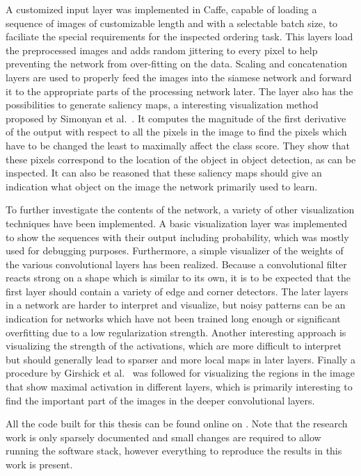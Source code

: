 A customized input layer was implemented in Caffe, capable of loading a sequence of images of customizable length and with a selectable batch size, to faciliate the special requirements for the inspected ordering task. This layers load the preprocessed images and adds random jittering to every pixel to help preventing the network from over-fitting on the data. Scaling and concatenation layers are used to properly feed the images into the siamese network and forward it to the appropriate parts of the processing network later. The layer also has the possibilities to generate saliency maps, a interesting visualization method proposed by Simonyan et al.~\cite{simonyan2013}. It computes the magnitude of the first derivative of the output with respect to all the pixels in the image to find the pixels which have to be changed the least to maximally affect the class score. They show that these pixels correspond to the location of the object in object detection, as can be inspected. It can also be reasoned that these saliency maps should give an indication what object on the image the network primarily used to learn.

To further investigate the contents of the network, a variety of other visualization techniques have been implemented. A basic visualization layer was implemented to show the sequences with their output including probability, which was mostly used for debugging purposes. Furthermore, a simple visualizer of the weights of the various convolutional layers has been realized. Because a convolutional filter reacts strong on a shape which is similar to its own, it is to be expected that the first layer should contain a variety of edge and corner detectors. The later layers in a network are harder to interpret and visualize, but noisy patterns can be an indication for networks which have not been trained long enough or significant overfitting due to a low regularization strength\needref. Another interesting approach is visualizing the strength of the activations, which are more difficult to interpret but should generally lead to sparser and more local maps in later layers. Finally a procedure by Girshick et al.~\cite{girshick2014} was followed for visualizing the regions in the image that show maximal activation in different layers, which is primarily interesting to find the important part of the images in the deeper convolutional layers.

All the code built for this thesis can be found online on \needref. Note that the research work is only sparsely documented and small changes are required to allow running the software stack, however everything to reproduce the results in this work is present.
